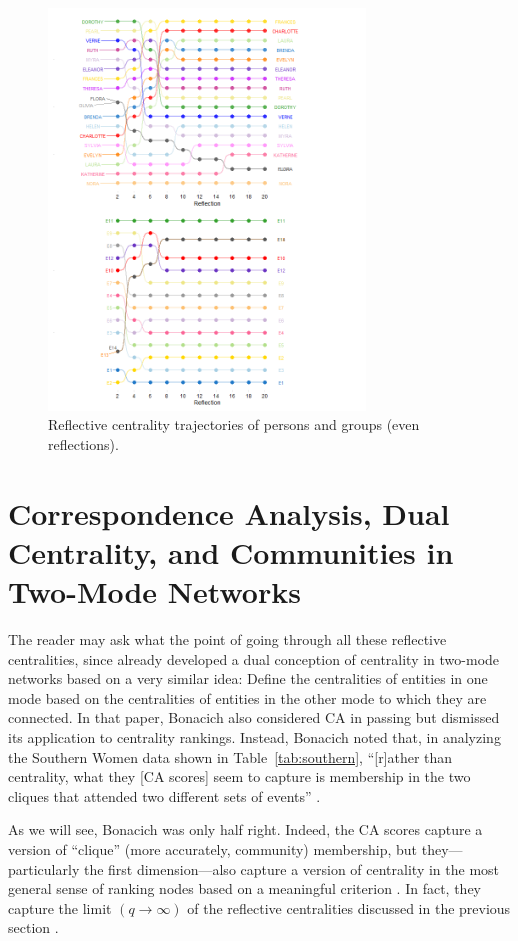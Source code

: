 \documentclass[a4paper,fleqn]{cas-sc}
\begin{document}
\begin{figure}
    \centering
    \includegraphics[width=0.75\textwidth]{Plots/pg-reflections.jpg}
    \caption{Reflective centrality trajectories of persons and groups (even reflections).}
    \label{fig:pg-reflections}
\end{figure}
\section{Correspondence Analysis, Dual Centrality, and Communities in Two-Mode Networks}
The reader may ask what the point of going through all these reflective centralities, since \citet{bonacich1991simultaneous} already developed a dual conception of centrality in two-mode networks based on a very similar idea: Define the centralities of entities in one mode based on the centralities of entities in the other mode to which they are connected. In that paper, Bonacich also considered CA in passing but dismissed its application to centrality rankings. Instead, Bonacich noted that, in analyzing the Southern Women data shown in Table~\ref{tab:southern}, ``[r]ather than centrality, what they [CA scores] seem to capture is membership in the two cliques that attended two different sets of events'' \citeyearpar[164]{bonacich1991simultaneous}. 

As we will see, Bonacich was only half right. Indeed, the CA scores capture a version of ``clique'' (more accurately, community) membership, but they---particularly the first dimension---also capture a version of centrality in the most general sense of ranking nodes based on a meaningful criterion \citep{borgatti2006graph}. In fact, they capture the limit $(q \rightarrow \infty)$ of the reflective centralities discussed in the previous section \citep{mealy2019interpreting}. 
\end{document}
